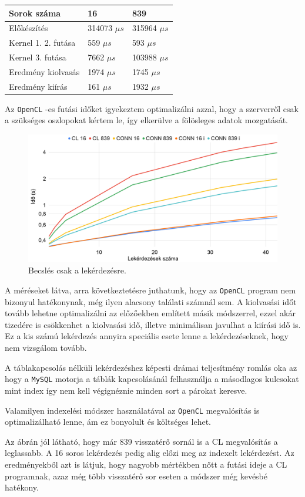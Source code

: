 \begin{table}[h!]
\centering
\begin{tabular}{|p{6cm}|p{3cm}|p{3cm}|}
\hline
Sorok száma & 16 & 839 \\
\hline
\hline
Előkészítés & 314073 $\mu s$ & 315964 $\mu s$ \\
\hline
Kernel 1. 2. futása & 559 $\mu s$ & 593 $\mu s$ \\
\hline
Kernel 3. futása & 7662 $\mu s$ & 103988 $\mu s$ \\
\hline
Eredmény kiolvasás & 1974 $\mu s$ & 1745 $\mu s$ \\
\hline
Eredmény kiírás & 161 $\mu s$ & 1932 $\mu s$ \\
\hline
\end{tabular}
\end{table}	

Az \texttt{OpenCL} -es futási időket igyekeztem optimalizálni azzal, hogy a szerverről csak a szükséges oszlopokat kértem le, így elkerülve a fölösleges adatok mozgatását.

\begin{figure}[h!]
\centering
\includegraphics[width=\textwidth]{images/test/join.png}
\caption{Becslés csak a lekérdezésre.}
\label{fig:schema}
\end{figure}

A méréseket látva, arra következtetésre juthatunk, hogy az \texttt{OpenCL} program nem bizonyul hatékonynak, még ilyen alacsony találati számnál sem. A kiolvasási időt tovább lehetne optimalizálni az előzőekben említett másik módszerrel, ezzel akár tizedére is csökkenhet a kiolvasási idő, illetve minimálisan javulhat a kiírási idő is. Ez a kis számú lekérdezés annyira speciális esete lenne a lekérdezéseknek, hogy nem vizsgálom tovább.

A táblakapcsolás nélküli lekérdezéshez képesti drámai teljesítmény romlás oka az hogy a \texttt{MySQL} motorja a táblák kapcsolásánál felhasználja a másodlagos kulcsokat mint index így nem kell végignéznie minden sort a párokat keresve.

Valamilyen indexelési módszer használatával az \texttt{OpenCL} megvalósítás is optimalizálható lenne, ám ez bonyolult és költséges lehet.

Az ábrán jól látható, hogy már 839 visszatérő sornál is a CL megvalósítás a leglassabb. A 16 soros lekérdezés pedig alig előzi meg az indexelt lekérdezést.
Az eredményekből azt is látjuk, hogy nagyobb mértékben nőtt a futási ideje a CL programnak, azaz még több visszatérő sor eseten a módszer még kevésbé hatékony.
